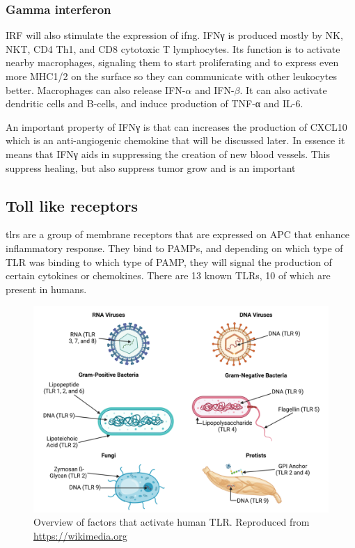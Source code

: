 \subsubsection{Gamma interferon}
\label{in:ITFG}

IRF will also stimulate the expression of \gls{ifng}. IFNγ is produced mostly by NK, NKT, CD4 Th1, and CD8 cytotoxic T lymphocytes. Its function is to activate nearby macrophages, signaling them to start proliferating and to express even more MHC1/2 on the surface so they can communicate with other leukocytes better. Macrophages can also release IFN-$\alpha$ and IFN-$\beta$. It can also activate dendritic cells and B-cells, and induce production of TNF-α and IL-6.

An important property of IFNγ is that can increases the production of CXCL10 which is an anti-angiogenic chemokine that will be discussed later. In essence it means that IFNγ aids in suppressing the creation of new blood vessels. This suppress healing, but also suppress tumor grow and is an important 

\subsection{Toll like receptors}

\gls{tlrs} are a group of membrane receptors that are expressed on APC that enhance inflammatory response. They bind to PAMPs, and depending on which type of TLR was binding to which type of PAMP, they will signal the production of certain cytokines or chemokines. There are 13 known TLRs, 10 of which are present in humans.

    \begin{figure}[ht]
        \centering
            \includegraphics[width=0.7\linewidth]{figures/Inflammation/Toll-Like_Receptors_(TLRs).png } 
        \caption{Overview of factors that activate human TLR. Reproduced from \url{https://wikimedia.org}}
        \label{figure:TLRhell}
    \end{figure}

